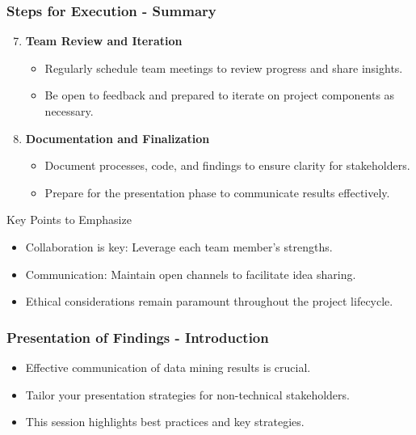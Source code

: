 \documentclass[aspectratio=169]{beamer}
\begin{document}
\begin{frame}
    \frametitle{Steps for Execution - Summary}
    \begin{enumerate}
        \setcounter{enumi}{6} %
        \item \textbf{Team Review and Iteration}
            \begin{itemize}
                \item Regularly schedule team meetings to review progress and share insights.
                \item Be open to feedback and prepared to iterate on project components as necessary.
            \end{itemize}
        
        \item \textbf{Documentation and Finalization}
            \begin{itemize}
                \item Document processes, code, and findings to ensure clarity for stakeholders.
                \item Prepare for the presentation phase to communicate results effectively.
            \end{itemize}
    \end{enumerate}
    \begin{block}{Key Points to Emphasize}
        \begin{itemize}
            \item Collaboration is key: Leverage each team member's strengths.
            \item Communication: Maintain open channels to facilitate idea sharing.
            \item Ethical considerations remain paramount throughout the project lifecycle.
        \end{itemize}
    \end{block}
\end{frame}

\begin{frame}[fragile]
    \frametitle{Presentation of Findings - Introduction}
    \begin{itemize}
        \item Effective communication of data mining results is crucial.
        \item Tailor your presentation strategies for non-technical stakeholders.
        \item This session highlights best practices and key strategies.
    \end{itemize}
\end{frame}
\end{document}
